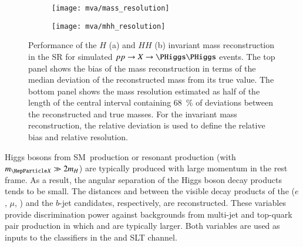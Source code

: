 


\begin{figure}[htbp]
  \centering

  \begin{subfigure}[t]{.45\textwidth}
    \centering
    \texttt{[image: mva/mass\_resolution]}
    \label{fig:mass_reconstruction_H}
  \end{subfigure}\hspace*{0.05\textwidth}%
  \begin{subfigure}[t]{.45\textwidth}
    \centering
    \texttt{[image: mva/mhh\_resolution]}
    \label{fig:mass_reconstruction_HH}
  \end{subfigure}%

  \caption[Performance of the $H$ and $HH$ invariant mass reconstruction in the
  \hadhad SR.]{Performance of the $H$ (a) and $HH$ (b) invariant mass
    reconstruction in the \hadhad SR for simulated $\pp \to X \to \HH$
    events. The top panel shows the bias of the mass reconstruction in terms of
    the median deviation of the reconstructed mass from its true value. The
    bottom panel shows the mass resolution estimated as half of the length of
    the central interval containing \SI{68}{\percent} of deviations between the
    reconstructed and true masses. For the \HH invariant mass reconstruction,
    the relative deviation is used to define the relative bias and relative
    resolution.}%
  \label{fig:mass_reconstruction}
\end{figure}

Higgs bosons from SM~\HH production or resonant \HH production (with
$\mX \gg 2\mH$) are typically produced with large momentum in the \HH rest
frame. As a result, the angular separation of the Higgs boson decay products
tends to be small. The distances \dRtautau and \dRbb between the visible decay
products of the \tauleptons ($e$, $\mu$, \tauhadvis) and the $b$-jet candidates,
respectively, are reconstructed. These variables provide discrimination power
against backgrounds from multi-jet and top-quark pair production in which
\dRtautau and \dRbb are typically larger. Both variables are used as inputs to
the classifiers in the \hadhad and \lephad SLT channel.

